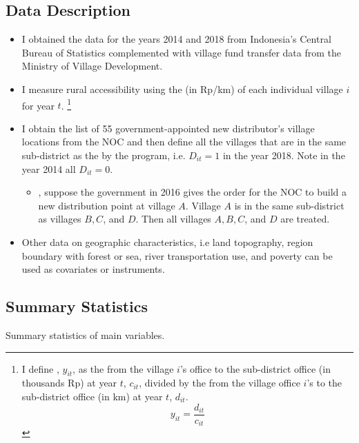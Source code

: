 \documentclass[
11pt,notheorems,compress,hyperref={pdfauthor=Maghfira Ramadhani}
]{beamer}
\begin{document}
\subsection{Data Description}
\begin{frame}
    \begin{itemize}
        \item I obtained the  data for the years 2014 and 2018 from Indonesia's Central Bureau of Statistics complemented with village fund transfer data from the Ministry of Village Development.
        \pause\item I measure rural accessibility using the  (in Rp/km) of each individual village $i$ for year $t$. 
        \footnote{I define , $y_{it}$, as the  from the village $i$'s office to the sub-district office (in thousands Rp) at year $t$, $c_{it}$, divided by the  from the village office $i$'s to the sub-district office (in km) at year $t$, $d_{it}$.
        \begin{equation}
        y_{it}=\frac{d_{it}}{c_{it}}    
        \end{equation}}
        \pause\item I obtain the list of 55 government-appointed new distributor's village locations from the NOC and then define all the villages that are in the same sub-district as the  by the program, i.e. $D_{it}=1$ in the year 2018. Note in the year 2014 all $D_{it}=0$. 
        \begin{itemize}
            \item {}, suppose the government in 2016 gives the order for the NOC to build a new distribution point at village $A$. Village $A$ is in the same sub-district as villages $B,C$, and $D$. Then all villages $A,B,C$, and $D$ are treated.
        \end{itemize}
        \pause\item Other data on geographic characteristics, i.e land topography, region boundary with forest or sea, river transportation use, and poverty can be used as covariates or instruments.
    \end{itemize}
\end{frame}

\subsection{Summary Statistics}
\begin{frame}
    \begin{table}[h]
    \caption{Summary statistics of main variables. }
    \scalebox{0.75}{}
    \label{t1}\end{table}
\end{frame}
\end{document}
